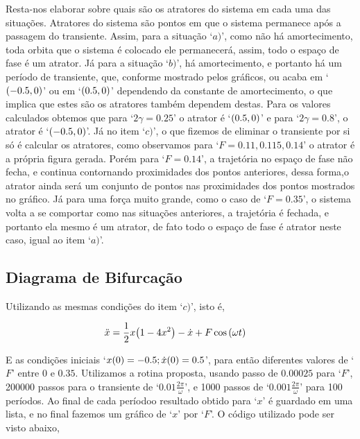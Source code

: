 \documentclass[twoside]{amsart}
\numberwithin{equation}{section}
\begin{document}
Resta-nos elaborar sobre quais são os atratores do sistema em cada uma das situações. Atratores do sistema são pontos 
em que o sistema permanece após a passagem do transiente. Assim, para a situação `$a)$', como não há amortecimento, 
toda orbita que o sistema é colocado ele permanecerá, assim, todo o espaço de fase é um atrator. Já para a situação `$b)$', 
há amortecimento, e portanto há um período de transiente, que, conforme mostrado pelos gráficos, ou acaba em `$\qty(-0.5, 0)$' 
ou em `$\qty(0.5, 0)$' dependendo da constante de amortecimento, o que implica que estes são os atratores também dependem 
destas. Para os valores calculados obtemos que para `$2\gamma=0.25$' o atrator é `$\qty(0.5,0)$' e para `$2\gamma=0.8$', o 
atrator é `$\qty(-0.5,0)$'. Já no item `$c)$', o que fizemos de eliminar o transiente por si só é calcular os atratores, 
como observamos para `$F=0.11,0.115,0.14$' o atrator é a própria figura gerada. Porém para `$F=0.14$', a trajetória no 
espaço de fase não fecha, e continua contornando proximidades dos pontos anteriores, dessa forma,o atrator ainda será um conjunto 
de pontos nas proximidades dos pontos mostrados no gráfico. Já para uma força muito grande, como o caso de `$F=0.35$', o sistema 
volta a se comportar como nas situações anteriores, a trajetória é fechada, e portanto ela mesmo é um atrator, de fato todo o espaço 
de fase é atrator neste caso, igual ao item `$a)$'.

\subsection{Diagrama de Bifurcação}

Utilizando as mesmas condições do item `$c)$', isto é,

\begin{align}
    \ddot x&=\frac12 x\qty(1-4x^2)-\dot x+ F\cos\qty(\omega t)\nonumber
\end{align}

E as condições iniciais `$x\qty(0)=-0.5;\dot x\qty(0)=0.5$', para então diferentes valores de `$F$' entre $0$ e $0.35$. Utilizamos a 
rotina proposta, usando passo de $0.00025$ para `$F$', 200000 passos para o transiente de `$0.01\frac{2\pi}{\omega}$', e 1000 passos de 
`$0.001\frac{2\pi}{\omega}$' para 100 períodos. Ao final de cada períodoo resultado obtido para `$x$' é guardado em uma lista, e no final 
fazemos um gráfico de `$x$' por `$F$'. O código utilizado pode ser visto abaixo,
\end{document}
